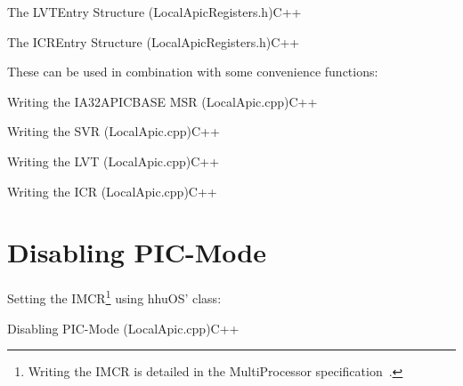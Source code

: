 \begin{codeblock}[label=lst:lvtentry]{The LVTEntry Structure (LocalApicRegisters.h)}{C++}
\end{codeblock}

\begin{codeblock}[label=lst:icrentry]{The ICREntry Structure (LocalApicRegisters.h)}{C++}
\end{codeblock}

These can be used in combination with some convenience functions:

\begin{codeblock}{Writing the IA32\textunderscore{}APIC\textunderscore{}BASE MSR (LocalApic.cpp)}{C++}
\end{codeblock}

\begin{codeblock}{Writing the SVR (LocalApic.cpp)}{C++}
\end{codeblock}

\begin{codeblock}{Writing the LVT (LocalApic.cpp)}{C++}
\end{codeblock}

\begin{codeblock}{Writing the ICR (LocalApic.cpp)}{C++}
\end{codeblock}


\section{Disabling PIC-Mode}
\label{sec:apxdisablepic}

Setting the IMCR\footnote{Writing the IMCR is detailed in the MultiProcessor
  specification~\cite[sec. 3.6.2.1]{mpspec}.} using hhuOS'  class:

\begin{codeblock}{Disabling PIC-Mode (LocalApic.cpp)}{C++}
\end{codeblock}


